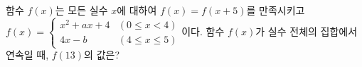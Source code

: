 함수 $f(x)$는 모든 실수 $x$에 대하여 $f(x)=f(x+5)$를 만족시키고 $f(x)=\begin{cases} x^2+ax+4 & (0\le x<4) \\ 4x-b & (4\le x\le 5) \end{cases}$이다. 함수 $f(x)$가 실수 전체의 집합에서 연속일 때, $f(13)$의 값은? 
